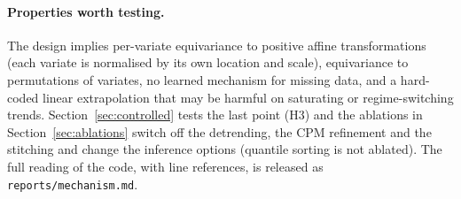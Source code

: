 \paragraph{Properties worth testing.} The design implies per-variate equivariance to positive affine transformations (each variate
is normalised by its own location and scale), equivariance to permutations of variates, no learned mechanism for missing data, and a
hard-coded linear extrapolation that may be harmful on saturating or regime-switching trends. Section~\ref{sec:controlled} tests the
last point (H3) and the ablations in Section~\ref{sec:ablations} switch off the detrending, the CPM refinement and the
stitching and change the inference options (quantile sorting is not ablated). The full reading of the code,
with line references, is released as \texttt{reports/mechanism.md}.
